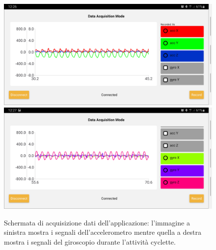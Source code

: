 \begin{figure}[h]
	\centering
	\includegraphics[width=0.49\linewidth]{./ImageFiles/acquisition_acc.jpg}
	\includegraphics[width=0.49\linewidth]{./ImageFiles/acquisition_gyro.jpg}
	\caption{Schermata di acquisizione dati dell'applicazione: l'immagine a sinistra mostra i segnali dell'accelerometro mentre quella a destra mostra i segnali del giroscopio durante l'attività cyclette.}
	\label{fig:schermata_acq}
\end{figure}


